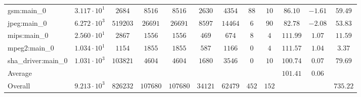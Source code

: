 \begin{tabular}{|l|c|c|c|c|c|c|c|c|c|c|c|}
gsm:main\_0             & $ 3.117 \cdot 10^{1} $ & $ 2684   $ & $ 8516   $ & $ 8516   $ & $ 2630  $ & $ 4354  $ & $ 88  $ & $ 10  $ & $ 86.10       $ & $ -1.61   $ & $ 59.49   $ \\
jpeg:main\_0            & $ 6.272 \cdot 10^{3} $ & $ 519203 $ & $ 26691  $ & $ 26691  $ & $ 8597  $ & $ 14464 $ & $ 6   $ & $ 90  $ & $ 82.78       $ & $ -2.08   $ & $ 53.83   $ \\
mips:main\_0            & $ 2.560 \cdot 10^{1} $ & $ 2867   $ & $ 1556   $ & $ 1556   $ & $ 469   $ & $ 674   $ & $ 8   $ & $ 4   $ & $ 111.99      $ & $ 1.07    $ & $ 11.59   $ \\
mpeg2:main\_0           & $ 1.034 \cdot 10^{1} $ & $ 1154   $ & $ 1855   $ & $ 1855   $ & $ 587   $ & $ 1166  $ & $ 0   $ & $ 4   $ & $ 111.57      $ & $ 1.04    $ & $ 3.37    $ \\
sha\_driver:main\_0     & $ 1.031 \cdot 10^{3} $ & $ 103821 $ & $ 4604   $ & $ 4604   $ & $ 1680  $ & $ 3546  $ & $ 0   $ & $ 10  $ & $ 100.74      $ & $ 0.07    $ & $ 79.69   $ \\
\hline
Average                 & $                    $ & $        $ & $        $ & $        $ & $       $ & $       $ & $     $ & $     $ & $ 101.41      $ & $ 0.06    $ & $         $ \\
\hline
Overall                 & $ 9.213 \cdot 10^{3} $ & $ 826232 $ & $ 107680 $ & $ 107680 $ & $ 34121 $ & $ 62479 $ & $ 452 $ & $ 152 $ & $             $ & $         $ & $ 735.22  $ \\
\hline
\end{tabular}
